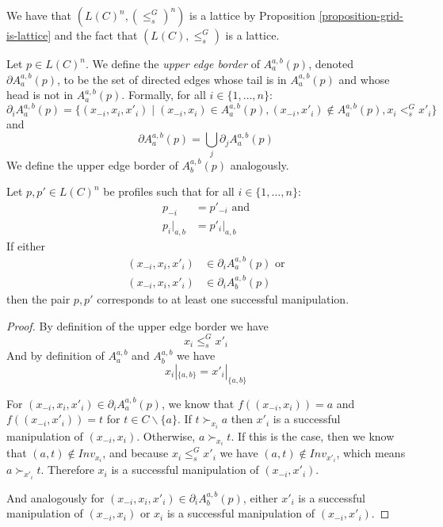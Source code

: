	We have that $(L(C)^n, (\le^G_s)^n)$ is a lattice by Proposition \ref{proposition-grid-is-lattice} and the fact that $(L(C), \le^G_s)$ is a lattice.

	\begin{definition}
		Let $p \in L(C)^n$. We define the \emph{upper edge border} of $A^{a,b}_a(p)$, denoted $\partial A^{a,b}_a(p)$, to be the set of directed edges whose tail is in $A^{a,b}_a(p)$ and whose head is not in $A^{a,b}_a(p)$. Formally, for all $i \in \{1, \ldots, n\}$:
			\[
				\partial_i A^{a,b}_a(p) = \{ (x_{-i}, x_i, x'_i) \mid (x_{-i}, x_i) \in A^{a,b}_a(p), (x_{-i}, x'_i) \notin A^{a,b}_a(p), x_i <^G_s x'_i \}
			\]
		and
			\[
				\partial A^{a,b}_a(p) = \bigcup_j \partial_j A^{a,b}_a(p)
			\]
		We define the upper edge border of $A^{a,b}_b(p)$ analogously.
	\end{definition}

	\begin{lemma}
		\label{manipulation-per-edge-in-a}
		Let $p, p' \in L(C)^n$ be profiles such that for all $i \in \{1, \ldots, n\}$:
		\begin{align*}
			p_{-i} &= p'_{-i} \textrm{ and} \\
			p_i|_{a,b} &= p'_i|_{a,b}
		\end{align*}
		If either
		\begin{align*}
			(x_{-i}, x_i, x'_i) &\in \partial_i A^{a,b}_a(p) \textrm{ or} \\
			(x_{-i}, x_i, x'_i) &\in \partial_i A^{a,b}_b(p)
		\end{align*}
		then the pair $p, p'$ corresponds to at least one successful manipulation.
	\end{lemma}

	\begin{proof}
		By definition of the upper edge border we have
		\[
			x_i \le^G_s x'_i
		\]
		And by definition of $A^{a,b}_a$ and $A^{a,b}_b$ we have
		\[
			x_i|_{\{a,b\}} = x'_i|_{\{a,b\}}
		\]

		For $(x_{-i}, x_i, x'_i) \in \partial_i A^{a,b}_a(p)$, we know that $f((x_{-i}, x_i)) = a$ and $f((x_{-i}, x'_i)) = t$ for $t \in C \backslash \{a\}$. If $t \succ_{x_i} a$ then $x'_i$ is a successful manipulation of $(x_{-i}, x_i)$. Otherwise, $a \succ_{x_i} t$. If this is the case, then we know that $(a, t) \notin Inv_{x_i}$, and because $x_i \le^G_s x'_i$ we have $(a, t) \notin Inv_{x'_i}$, which means $a \succ_{x'_i} t$. Therefore $x_i$ is a successful manipulation of $(x_{-i}, x'_i)$.

		And analogously for $(x_{-i}, x_i, x'_i) \in \partial_i A^{a,b}_b(p)$, either $x'_i$ is a successful manipulation of $(x_{-i}, x_i)$ or $x_i$ is a successful manipulation of $(x_{-i}, x'_i)$.
	\end{proof}


